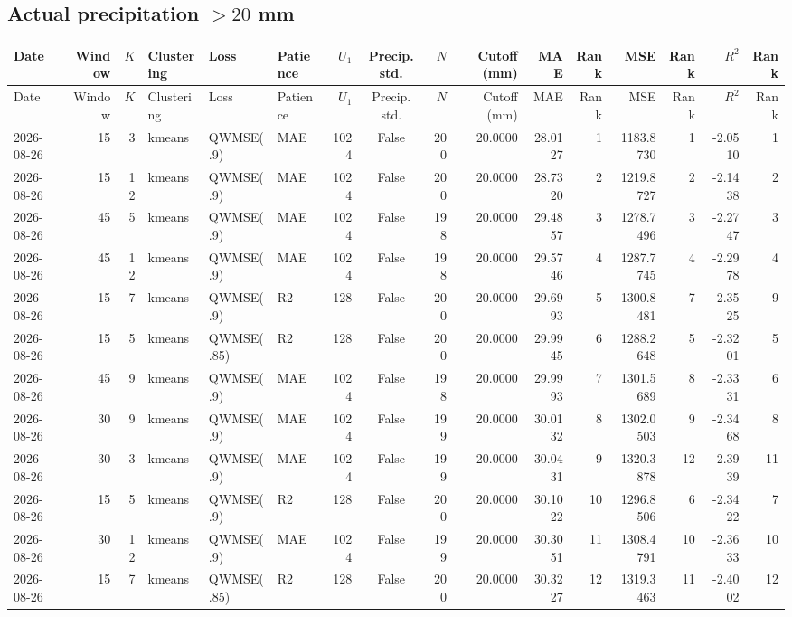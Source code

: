 \documentclass[10pt]{article}
\begin{document}
\begin{landscape}
\subsection*{Actual precipitation $>20$ mm}
\footnotesize
\setlength{\tabcolsep}{3pt}
\begin{longtable}{@{}lrrlllrcrrrrrrrr@{}}
\toprule
Date & Window & $K$ & Clustering & Loss & Patience & $U_1$ & Precip. std. & $N$ & Cutoff (mm) & MAE & Rank & MSE & Rank & $R^2$ & Rank \\
\midrule
\endfirsthead
\toprule
Date & Window & $K$ & Clustering & Loss & Patience & $U_1$ & Precip. std. & $N$ & Cutoff (mm) & MAE & Rank & MSE & Rank & $R^2$ & Rank \\
\midrule
\endhead
2026-08-26 & 15 & 3 & kmeans & QWMSE(.9) & MAE & 1024 & False & 200 & 20.0000 & 28.0127 & 1 & 1183.8730 & 1 & -2.0510 & 1 \\
2026-08-26 & 15 & 12 & kmeans & QWMSE(.9) & MAE & 1024 & False & 200 & 20.0000 & 28.7320 & 2 & 1219.8727 & 2 & -2.1438 & 2 \\
2026-08-26 & 45 & 5 & kmeans & QWMSE(.9) & MAE & 1024 & False & 198 & 20.0000 & 29.4857 & 3 & 1278.7496 & 3 & -2.2747 & 3 \\
2026-08-26 & 45 & 12 & kmeans & QWMSE(.9) & MAE & 1024 & False & 198 & 20.0000 & 29.5746 & 4 & 1287.7745 & 4 & -2.2978 & 4 \\
2026-08-26 & 15 & 7 & kmeans & QWMSE(.9) & R2 & 128 & False & 200 & 20.0000 & 29.6993 & 5 & 1300.8481 & 7 & -2.3525 & 9 \\
2026-08-26 & 15 & 5 & kmeans & QWMSE(.85) & R2 & 128 & False & 200 & 20.0000 & 29.9945 & 6 & 1288.2648 & 5 & -2.3201 & 5 \\
2026-08-26 & 45 & 9 & kmeans & QWMSE(.9) & MAE & 1024 & False & 198 & 20.0000 & 29.9993 & 7 & 1301.5689 & 8 & -2.3331 & 6 \\
2026-08-26 & 30 & 9 & kmeans & QWMSE(.9) & MAE & 1024 & False & 199 & 20.0000 & 30.0132 & 8 & 1302.0503 & 9 & -2.3468 & 8 \\
2026-08-26 & 30 & 3 & kmeans & QWMSE(.9) & MAE & 1024 & False & 199 & 20.0000 & 30.0431 & 9 & 1320.3878 & 12 & -2.3939 & 11 \\
2026-08-26 & 15 & 5 & kmeans & QWMSE(.9) & R2 & 128 & False & 200 & 20.0000 & 30.1022 & 10 & 1296.8506 & 6 & -2.3422 & 7 \\
2026-08-26 & 30 & 12 & kmeans & QWMSE(.9) & MAE & 1024 & False & 199 & 20.0000 & 30.3051 & 11 & 1308.4791 & 10 & -2.3633 & 10 \\
2026-08-26 & 15 & 7 & kmeans & QWMSE(.85) & R2 & 128 & False & 200 & 20.0000 & 30.3227 & 12 & 1319.3463 & 11 & -2.4002 & 12 \\

\end{longtable}
\end{landscape}
\end{document}
